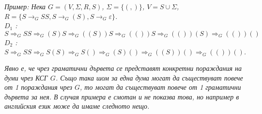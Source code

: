 \documentclass[fleqn,12pt]{article}
\begin{document}
\begin{center}
\end{center}

\noindent\textit{Пример:
Нека $G = (V, \Sigma, R, S)$, $\Sigma = \{(, )\}$, $V = {S} \cup \Sigma$, $R = \{S \to_G SS, S \to_G (S), S \to_G \varepsilon\}$. \\
$D_1$ : $S \Rightarrow_G SS \Rightarrow_G (S)S \Rightarrow_G ((S))S \Rightarrow_G (())S \Rightarrow_G (())(S) \Rightarrow_G (())()$ \\
$D_2$ : $S \Rightarrow_G SS \Rightarrow_G S(S) \Rightarrow_G S() \Rightarrow_G (S)() \Rightarrow_G ((S))() \Rightarrow_G (())()$.
}

\begin{center}
\end{center}

\textit{Явно е, че чрез граматични дървета се представят конкретни пораждания на думи чрез КСГ $G$. Също така шом за една дума могат да съществуват повече от 1 пораждания чрез $G$, то могат да съществуват повече от 1 граматични дървета за нея. В случая примера е смотан и не показва това, но например в английския език може да имаме следното нещо.}

\begin{center}
\end{center}
\end{document}
